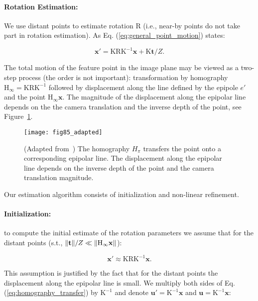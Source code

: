 \paragraph{Rotation Estimation:}\label{sec:rotation_estimation}
We use distant points to estimate rotation $\mathrm{R}$ (i.e., near-by
points do not take part in rotation estimation). As Eq.
(\ref{eq:general_point_motion}) states:

\begin{equation}
  \mathbf{x}' = \mathrm{KRK^{-1}}\mathbf{x} + \mathrm{K}\mathbf{t}/Z.
\end{equation}

The total motion of the feature point in the image plane may be viewed
as a two-step process (the order is not important): transformation by
homography $\mathrm{H_\infty} = \mathrm{KRK^{-1}}$ followed by
displacement along the line defined by the epipole $e'$ and the point
$\mathrm{H_\infty}\mathbf{x}$.  The magnitude of the displacement
along the epipolar line depends on the the camera translation and the
inverse depth of the point, see Figure~\ref{fig:feature_motion}.

\begin{figure}[h]
  \centering
  \texttt{[image: fig85\_adapted]}
  \caption{(Adapted from~\cite{Hartley2004}) The homography $H_\pi$ transfers the point onto a corresponding epipolar line.  The displacement along the epipolar line depends on the inverse depth of the point and the camera translation magnitude.}
  \label{fig:feature_motion}
\end{figure}                                                             %

Our estimation algorithm consists of initialization and non-linear
refinement.
\paragraph{Initialization:} to compute the initial estimate of the rotation
parameters we assume that for the distant points (s.t., $\lVert\mathbf{t}\rVert/Z \ll \lVert\mathrm{H_\infty}\mathbf{x}\rVert$):

\begin{equation}\label{eq:homography_transfer}
  \mathbf{x}' \approx \mathrm{KRK^{-1}}\mathbf{x}.
\end{equation}

This assumption is justified by the fact that for the distant points
the displacement along the epipolar line is small. We multiply
both sides of Eq. (\ref{eq:homography_transfer}) by $\mathrm{K^{-1}}$
and denote $\mathbf{u'} = \mathrm{K^{-1}}\mathbf{x}$ and
$\mathbf{u} = \mathrm{K^{-1}}\mathbf{x}$:

